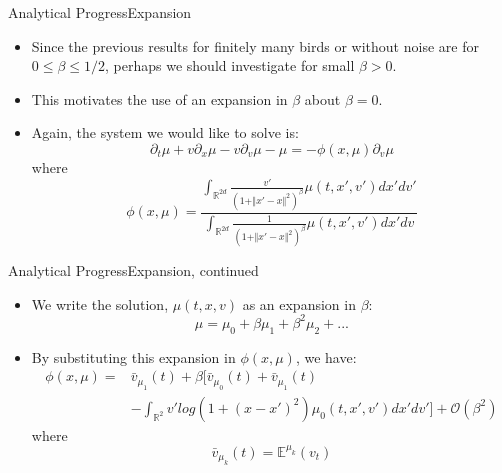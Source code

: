 \documentclass{beamer}
\begin{document}
\begin{frame}{Analytical Progress}{Expansion}
	\begin{itemize}
		\item {
			Since the previous results for finitely many birds or without noise are for $0 \leq \beta \leq 1/2$, perhaps we should investigate for small $\beta >0$.
		}
		\item {
			This motivates the use of an expansion in $\beta$ about $\beta=0$.
		}
		\item {
			Again, the system we would like to solve is:
			\begin{equation}
			\partial_t \mu+v \partial_x \mu-v \partial_v \mu-\mu=-\phi (x,\mu)\partial_v \mu
			\end{equation}
			where
			\begin{equation}
			\phi (x,\mu)=\frac{\int_{\mathbb{R}^{2d}} \frac{v'}{(1+\Vert x'-x \Vert^2)^\beta}\mu(t,x',v')dx'dv'}{\int_{\mathbb{R}^{2d}} \frac{1}{(1+\Vert x'-x \Vert^2)^\beta}\mu(t,x',v')dx'dv}
			\end{equation}
		}
	\end{itemize}
\end{frame}

\begin{frame}{Analytical Progress}{Expansion, continued}
	\begin{itemize}
		\item {
			We write the solution, $\mu(t,x,v)$ as an expansion in $\beta$:
			\begin{equation}
			\mu=\mu_0+\beta \mu_1+ \beta^2 \mu_2+...
			\end{equation}
		}
		\item {
			By substituting this expansion in $\phi(x,\mu)$, we have:
					\begin{equation}
					\begin{split}
					\phi(x,\mu)=&\bar{v}_{\mu_1}(t) +\beta [ \bar{v}_{\mu_0}(t)+\bar{v}_{\mu_1}(t) \\
					&-\int_{\mathbb{R}^2} v' log(1+(x-x')^2)\mu_0(t,x',v')dx'dv' ] + \mathcal{O}(\beta^2)
					\end{split}
					\end{equation}
			where
					\begin{equation}
					\bar{v}_{\mu_k}(t)=\mathbb{E}^{\mu_k}(v_t)
					\end{equation}
		}

	\end{itemize}

\end{frame}
\end{document}
